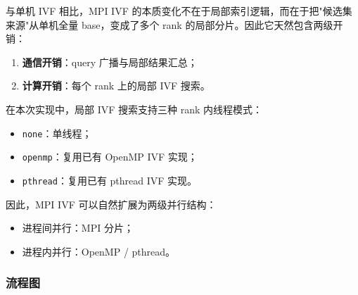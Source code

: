\documentclass[a4paper]{article}
\begin{document}
与单机 IVF 相比，MPI IVF 的本质变化不在于局部索引逻辑，而在于把"候选集来源"从单机全量 base，变成了多个 rank 的局部分片。因此它天然包含两级开销：

\begin{enumerate}
    \item \textbf{通信开销}：query 广播与局部结果汇总；
    \item \textbf{计算开销}：每个 rank 上的局部 IVF 搜索。
\end{enumerate}

在本次实现中，局部 IVF 搜索支持三种 rank 内线程模式：
\begin{itemize}
    \item \texttt{none}：单线程；
    \item \texttt{openmp}：复用已有 OpenMP IVF 实现；
    \item \texttt{pthread}：复用已有 pthread IVF 实现。
\end{itemize}

因此，MPI IVF 可以自然扩展为两级并行结构：
\begin{itemize}
    \item 进程间并行：MPI 分片；
    \item 进程内并行：OpenMP / pthread。
\end{itemize}

\subsubsection{流程图}
\end{document}
